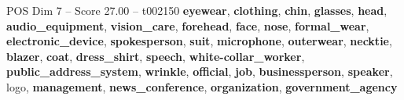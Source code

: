 \begin{textsample}{POS Dim 7 – Score 27.00 – t002150}  \label{ex:f7_pos_021}
\textbf{eyewear}, \textbf{clothing}, \textbf{chin}, \textbf{glasses}, \textbf{head}, \textbf{audio\_equipment}, \textbf{vision\_care}, \textbf{forehead}, \textbf{face}, \textbf{nose}, \textbf{formal\_wear}, \textbf{electronic\_device}, \textbf{spokesperson}, \textbf{suit}, \textbf{microphone}, \textbf{outerwear}, \textbf{necktie}, \textbf{blazer}, \textbf{coat}, \textbf{dress\_shirt}, \textbf{speech}, \textbf{white-collar\_worker}, \textbf{public\_address\_system}, \textbf{wrinkle}, \textbf{official}, \textbf{job}, \textbf{businessperson}, \textbf{speaker}, logo, \textbf{management}, \textbf{news\_conference}, \textbf{organization}, \textbf{government\_agency}

\end{textsample}
